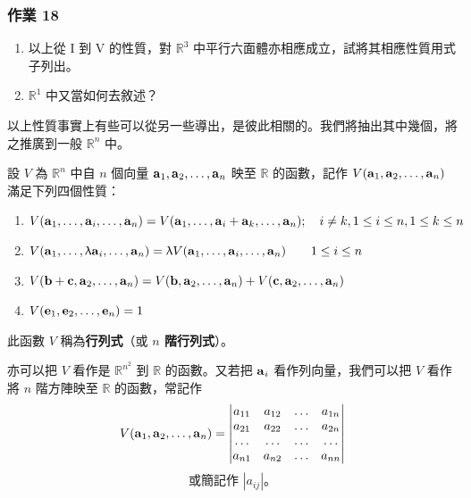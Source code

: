 \subsubsection*{作業 18}\label{hw:b6-1-18}
\begin{enumerate}[label=(\roman*), leftmargin=2em]
  \item 以上從 I 到 V 的性質，對 $\mathbb{R}^3$ 中平行六面體亦相應成立，試將其相應性質用式子列出。
  \item $\mathbb{R}^1$ 中又當如何去敘述？
\end{enumerate}

以上性質事實上有些可以從另一些導出，是彼此相關的。我們將抽出其中幾個，將之推廣到一般 $\mathbb{R}^n$ 中。

\begin{definition}\label{def:b6-1-5}
設 $V$ 為 $\mathbb{R}^n$ 中自 $n$ 個向量 $\boldsymbol{\mathbf{a}}_1, \boldsymbol{\mathbf{a}}_2, \dots, \boldsymbol{\mathbf{a}}_n$ 映至 $\mathbb{R}$ 的函數，記作 $V(\boldsymbol{\mathbf{a}}_1, \boldsymbol{\mathbf{a}}_2, \dots, \boldsymbol{\mathbf{a}}_n)$ 滿足下列四個性質：
\begin{enumerate}[label=(\Alph*), leftmargin=2em]
  \item $V(\boldsymbol{\mathbf{a}}_1, \dots, \boldsymbol{\mathbf{a}}_i, \dots, \boldsymbol{\mathbf{a}}_n) = V(\boldsymbol{\mathbf{a}}_1, \dots, \boldsymbol{\mathbf{a}}_i + \boldsymbol{\mathbf{a}}_k, \dots, \boldsymbol{\mathbf{a}}_n); \quad i \ne k, 1 \le i \le n, 1 \le k \le n$
  \item $V(\boldsymbol{\mathbf{a}}_1, \dots, \uplambda\boldsymbol{\mathbf{a}}_i, \dots, \boldsymbol{\mathbf{a}}_n) = \uplambda V(\boldsymbol{\mathbf{a}}_1, \dots, \boldsymbol{\mathbf{a}}_i, \dots, \boldsymbol{\mathbf{a}}_n) \qquad 1 \le i \le n$
  \item $V(\boldsymbol{\mathbf{b}} + \boldsymbol{\mathbf{c}}, \boldsymbol{\mathbf{a}}_2, \dots, \boldsymbol{\mathbf{a}}_n) = V(\boldsymbol{\mathbf{b}}, \boldsymbol{\mathbf{a}}_2, \dots, \boldsymbol{\mathbf{a}}_n) + V(\boldsymbol{\mathbf{c}}, \boldsymbol{\mathbf{a}}_2, \dots, \boldsymbol{\mathbf{a}}_n)$
  \item $V(\boldsymbol{\mathbf{e}}_1, \boldsymbol{\mathbf{e}}_2, \dots, \boldsymbol{\mathbf{e}}_n) = 1$
\end{enumerate}
此函數 $V$ 稱為\textbf{行列式}（或 \textbf{$n$ 階行列式}）。
\end{definition}

亦可以把 $V$ 看作是 $\mathbb{R}^{n^2}$ 到 $\mathbb{R}$ 的函數。又若把 $\boldsymbol{\mathbf{a}}_i$ 看作列向量，我們可以把 $V$ 看作將 $n$ 階方陣映至 $\mathbb{R}$ 的函數，常記作
\begin{equation}
V(\boldsymbol{\mathbf{a}}_1, \boldsymbol{\mathbf{a}}_2, \dots, \boldsymbol{\mathbf{a}}_n) = \begin{vmatrix}
a_{11} & a_{12} & \dots & a_{1n} \\
a_{21} & a_{22} & \dots & a_{2n} \\
\dots & \dots & \dots & \dots \\
a_{n1} & a_{n2} & \dots & a_{nn}
\end{vmatrix} \label{eq:b6-1-2-4}
\end{equation}
\begin{equation}
\text{或簡記作 } |a_{ij}|\text{。} \tag{4'} \label{eq:b6-1-2-4p}
\end{equation}


